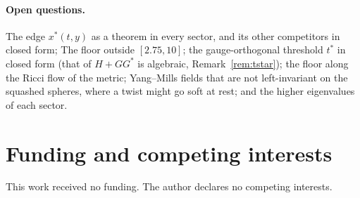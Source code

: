 \documentclass[11pt]{article}
\theoremstyle{definition}
\theoremstyle{remark}
\newif\ifredline
\newcommand{\redins}[1]{\ifredline{\color{blue}#1}\else#1\fi}
\begin{document}
\paragraph{Open questions.} \redins{The edge $x^*(t,y)$ as a theorem in every sector, and its other competitors in closed form; }The floor outside $[2.75,10]$; the gauge-orthogonal threshold $t^*$ in closed form (that of
$H+GG^*$ is algebraic, Remark~\ref{rem:tstar}); the floor along the Ricci flow of the metric; Yang--Mills fields that
are not left-invariant on the squashed spheres, where a twist might go soft at rest; and the higher eigenvalues
of each sector.

\section*{Funding and competing interests}
This work received no funding. The author declares no competing interests.
\end{document}
